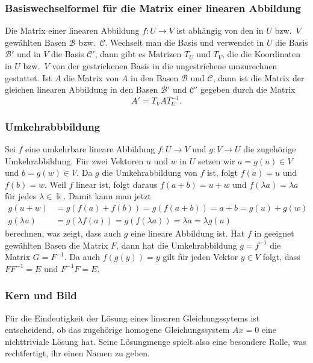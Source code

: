 \subsubsection{Basiswechselformel für die Matrix einer linearen Abbildung}
Die Matrix einer linearen Abbildung $f\colon U\to V$ ist abhängig von den
in $U$ bzw.~$V$ gewählten Basen $\mathcal{B}$ bzw.~$\mathcal{C}$.
Wechselt man die Basis und verwendet in $U$ die Basis $\mathcal{B}'$ und
in $V$ die Basis $\mathcal{C}'$, dann gibt es Matrizen
$T_U$ und $T_V$, die die Koordinaten in $U$ bzw.~$V$ von der gestrichenen
Basis in die ungestrichene umzurechnen gestattet.
Ist $A$ die Matrix von $A$ in den Basen $\mathcal{B}$ und $\mathcal{C}$,
dann ist die Matrix der gleichen linearen Abbildung in den Basen $\mathcal{B}'$
und $\mathcal{C}'$ gegeben durch die Matrix
\begin{equation}
A' = T_VAT_U^{-1}.
\label{buch:vektoren-und-matrizen:eqn:basiswechselabb}
\end{equation}

\subsubsection{Umkehrabbbildung}
Sei $f$ eine umkehrbare lineare Abbildung $f\colon U\to V$ und
$g\colon V\to U$ die zugehörige Umkehrabbildung.
%
Für zwei Vektoren $u$ und $w$ in $U$ setzen wir $a=g(u)\in V$
und $b=g(w)\in V$.
Da $g$ die Umkehrabbildung von $f$ ist, folgt $f(a)=u$ und $f(b)=w$.
Weil $f$ linear ist, folgt daraus
$f(a+b)=u+w$ und $f(\lambda a)=\lambda a$
für jedes $\lambda\in\Bbbk$.
Damit kann man jetzt
\begin{align*}
g(u+w)&=g(f(a)+f(b)) = g(f(a+b)) = a+b = g(u)+g(w)
\\
g(\lambda u) &= g(\lambda f(a))=g(f(\lambda a)) = \lambda a = \lambda g(u)
\end{align*}
berechnen, was zeigt, dass auch $g$ eine lineare Abbildung ist.
Hat $f$ in geeignet gewählten Basen die Matrix $F$, dann hat die
Umkehrabbildung $g=f^{-1}$ die Matrix $G=F^{-1}$.
Da auch $f(g(y))=y$ gilt für jeden Vektor $y\in V$ folgt, dass $FF^{-1}=E$
und $F^{-1}F=E$.

\subsubsection{Kern und Bild}
Für die Eindeutigkeit der Lösung eines linearen Gleichungssytems
ist entscheidend, ob das zugehörige homogene Gleichungssystem $Ax=0$
eine nichttriviale Lösung hat.
Seine Lösungmenge spielt also eine besondere Rolle, was rechtfertigt,
ihr einen Namen zu geben.


